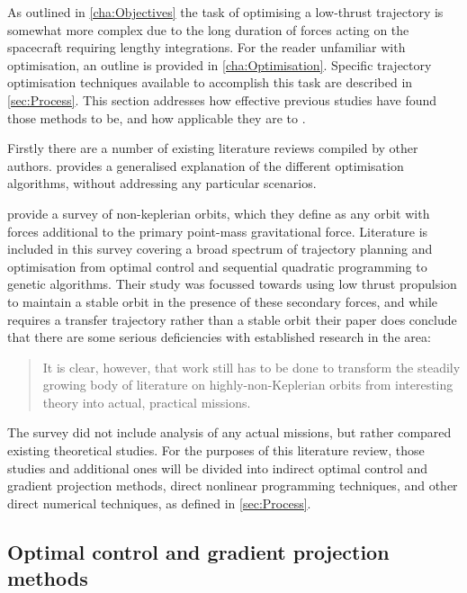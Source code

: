 As outlined in \autoref{cha:Objectives} the task of optimising a low-thrust trajectory is somewhat more complex due to the long duration of forces acting on the spacecraft requiring lengthy integrations. For the reader unfamiliar with optimisation, an outline is provided in \autoref{cha:Optimisation}. Specific trajectory optimisation techniques available to accomplish this task are described in \autoref{sec:Process}. This section addresses how effective previous studies have found those methods to be, and how applicable they are to \BW.

Firstly there are a number of existing literature reviews compiled by other authors. \textcite{Betts1998} provides a generalised explanation of the different optimisation algorithms, without addressing any particular scenarios. 

\textcite{McKay2011} provide a survey of non-keplerian orbits, which they define as any orbit with forces additional to the primary point-mass gravitational force. Literature is included in this survey covering a broad spectrum of trajectory planning and optimisation from optimal control and sequential quadratic programming to genetic algorithms. Their study was focussed towards using low thrust propulsion to maintain a stable orbit in the presence of these secondary forces, and while  requires a transfer trajectory rather than a stable orbit their paper does conclude that there are some serious deficiencies with established research in the area: 

\begin{quotation}It is clear, however, that work still has to be done to transform the steadily growing body of literature on highly-non-Keplerian orbits from interesting theory into actual, practical missions.
\end{quotation}

The survey did not include analysis of any actual missions, but rather compared existing theoretical studies. For the purposes of this literature review, those studies and additional ones will be divided into indirect optimal control and gradient projection methods, direct nonlinear programming techniques, and other direct numerical techniques, as defined in \autoref{sec:Process}.






\subsection{Optimal control and gradient projection methods} \label{sub:Optimal-control-lit}

